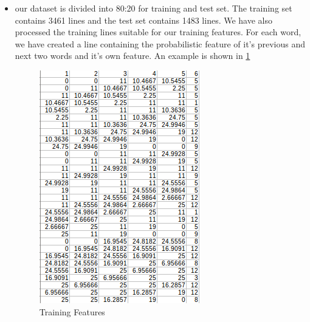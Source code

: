 \documentclass{standalone}
\begin{document}
\begin{itemize}
    \item our dataset is divided into 80:20 for training and test set. The training set contains 3461 lines and the test set contains 1483 lines. We have also processed the training lines suitable for our training features. For each word, we have created a line containing the probabilistic feature of it’s previous and next two words and it’s own feature. An example is shown in \ref{trainset}
    \begin{figure}[h!]
    \centering
    \includegraphics[width=1.0\columnwidth]{img/trainset.png}
    \caption{Training Features}
    \label{trainset}
    \end{figure}
\end{itemize}
\end{document}
